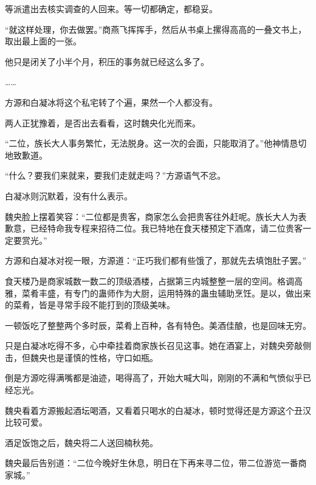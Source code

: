 \begin{this_body}
等派遣出去核实调查的人回来。等一切都确定，都稳妥。

“就这样处理，你去做罢。”商燕飞挥挥手，然后从书桌上摞得高高的一叠文书上，取出最上面的一张。

他只是闭关了小半个月，积压的事务就已经这么多了。

……

方源和白凝冰将这个私宅转了个遍，果然一个人都没有。

两人正犹豫着，是否出去看看，这时魏央化光而来。

“二位，族长大人事务繁忙，无法脱身。这一次的会面，只能取消了。”他神情恳切地致歉道。

“什么？要我们来就来，要我们走就走吗？”方源语气不忿。

白凝冰则沉默着，没有什么表示。

魏央脸上摆着笑容：“二位都是贵客，商家怎么会把贵客往外赶呢。族长大人为表歉意，已经特命我专程来招待二位。我已特地在食天楼预定下酒席，请二位贵客一定要赏光。”

方源和白凝冰对视一眼，方源道：“正巧我们都有些饿了，那就先去填饱肚子罢。”

食天楼乃是商家城数一数二的顶级酒楼，占据第三内城整整一层的空间。格调高雅，菜肴丰盛，有专门的蛊师作为大厨，运用特殊的蛊虫辅助烹饪。是以，做出来的菜肴，皆是寻常手段不能打到的顶级美味。

一顿饭吃了整整两个多时辰，菜肴上百种，各有特色。美酒佳酿，也是回味无穷。

只是白凝冰吃得不多，心中牵挂着商家族长召见这事。她在酒宴上，对魏央旁敲侧击，但魏央也是谨慎的性格，守口如瓶。

倒是方源吃得满嘴都是油迹，喝得高了，开始大喊大叫，刚刚的不满和气愤似乎已经忘光。

魏央看着方源搬起酒坛喝酒，又看着只喝水的白凝冰，顿时觉得还是方源这个丑汉比较可爱。

酒足饭饱之后，魏央将二人送回楠秋苑。

魏央最后告别道：“二位今晚好生休息，明日在下再来寻二位，带二位游览一番商家城。”

\end{this_body}

